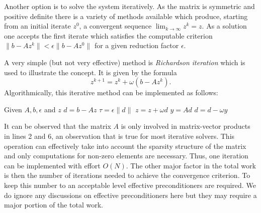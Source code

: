 \documentclass[a4paper,12pt]{article}
\begin{document}
Another option is to solve the system iteratively. As the matrix is symmetric and positive
definite there is a variety of methods available which produce, starting from an
initial iterate $z^0$, a convergent sequence $\lim_{k\to\infty} z^k = z$. As a solution
one accepts the first iterate which satisfies the computable criterion
$\|b-Az^k\| < \epsilon \|b-Az^0\|$ for a given reduction factor $\epsilon$.

A very simple (but not very effective) method is {\em Richardson iteration} which is
used to illustrate the concept. It is given by the formula
$$ z^{k+1} = z^{k} + \omega (b-Az^{k}).$$
Algorithmically, this iterative method can be implemented as follows:
\begin{algorithmic}[1]
\State Given $A, b, \epsilon$ and $z$ 
\State $d = b-Az$ 
\State $\tau = \epsilon \|d\|$ 
 
\State $z = z + \omega d$ 
\State $y = A d$ 
\State $d = d - \omega y$ 
\EndWhile
\end{algorithmic}
It can be observed that the matrix $A$ is only involved in matrix-vector
products in lines 2 and 6, an observation that is true for most iterative
solvers. This operation can effectively take into account the sparsity structure
of the matrix and only computations for non-zero elements are necessary.
Thus, one iteration can be implemented with effort $O(N)$. 
The other major factor in the total work is then the number
of iterations needed to achieve the convergence criterion. To keep this
number to an acceptable level effective preconditioners are required.
We do ignore any discussions on effective preconditioners here but they may require 
a major portion of the total work.
\end{document}
